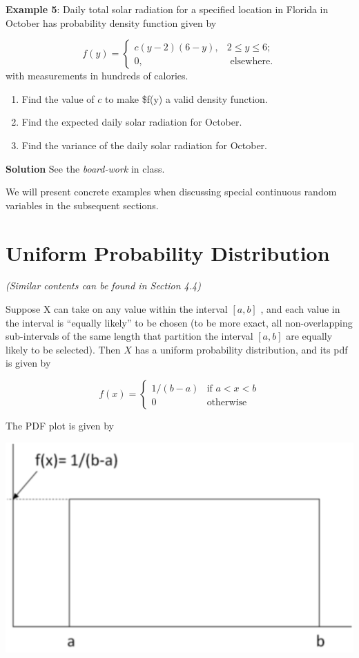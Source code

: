 \documentclass[
]{book}
\begin{document}
\textbf{Example 5}: Daily total solar radiation for a specified location in Florida in October has probability density
function given by

\[
\displaystyle f(y) = \begin{cases} 
 c(y-2)(6-y),  & 2 \le y \le 6;   \\  
 0,    & \text{ elsewhere}.
 \end{cases}
\]
with measurements in hundreds of calories.

\begin{enumerate}
\def\labelenumi{\alph{enumi}.}
\item
  Find the value of \(c\) to make \$f(y) a valid density function.
\item
  Find the expected daily solar radiation for October.
\item
  Find the variance of the daily solar radiation for October.
\end{enumerate}

\textbf{Solution} See the \emph{board-work} in class.

\hfill\break

We will present concrete examples when discussing special continuous random variables in the subsequent sections.

\hfill\break

\hypertarget{uniform-probability-distribution}{%
\section{Uniform Probability Distribution}\label{uniform-probability-distribution}}

\emph{(Similar contents can be found in Section 4.4)}

\hfill\break

Suppose X can take on any value within the interval \([a, b]\) , and each value in the interval is ``equally likely'' to be chosen (to be more exact, all non-overlapping sub-intervals of the same length that partition the interval \([a, b]\) are equally likely to be selected). Then \(X\) has a uniform probability distribution, and its pdf is given by

\[
\displaystyle f(x) = \begin{cases} 
 1/(b-a) & \text{if $a < x < b$} \\  
 0 & \text{otherwise}  
 \end{cases}
\]

The PDF plot is given by

\begin{center}\includegraphics[width=0.4\linewidth]{topic03/uniformDensityCurve} \end{center}
\end{document}

